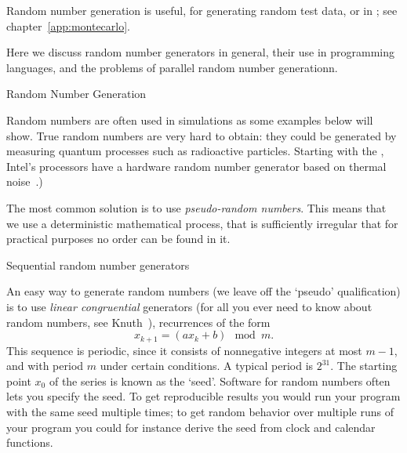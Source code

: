 
Random number generation is useful,
for generating random test data,
or in ;
see chapter~\ref{app:montecarlo}.

Here we discuss random number generators in general,
their use in programming languages,
and the problems of parallel random number generationn.

 {Random Number Generation}

Random numbers are often used in simulations as some examples below
will show. True random numbers are very hard to obtain: they could be
generated by measuring quantum processes such as radioactive
particles. Starting with the ,
Intel's processors have a hardware random number generator based on
thermal noise~\cite{Cryptography:IvyRandom2012}.)

The most common solution is to use
\emph{pseudo-random numbers}. This means that we use a deterministic mathematical
process, that is sufficiently irregular that for practical purposes no
order can be found in it.

 {Sequential random number generators}

An easy way to generate random numbers (we leave off the `pseudo'
qualification) is to use
\emph{linear congruential}
 generators (for all you
ever need to know about random numbers, see Knuth~\cite{Knuth:vol2}),
recurrences of the form
\[ x_{k+1} = (ax_k+b) \mod m. \]
This sequence is periodic, since it consists of nonnegative integers at most
$m-1$, and with period $m$ under certain conditions. A
typical period is $2^{31}$. The starting point $x_0$ of the series is
known as the `seed'. Software for random numbers often lets you
specify the seed. To get reproducible results you would run your
program with the same seed multiple times; to get random behavior
over multiple runs of your program you could for instance derive the
seed from clock and calendar functions.

